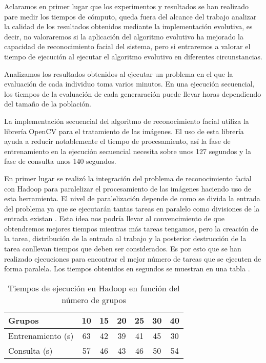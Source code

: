 \label{resultados-facerecognition}

Aclaramos en primer lugar que los experimentos y resultados se han realizado pare medir los tiempos de cómputo, queda fuera del alcance del trabajo analizar la calidad de los resultados obtenidos mediante la implementación evolutiva, es decir, no valoraremos si la aplicaci\'on del algoritmo evolutivo ha mejorado la capacidad de reconocimiento facial del sistema, pero si entraremos a valorar el tiempo de ejecuci\'on al ejecutar el algoritmo evolutivo en diferentes circunstancias.

Analizamos los resultados obtenidos al ejecutar un problema en el que la evaluación de cada individuo toma varios minutos. En una ejecuci\'on secuencial, los tiempos de la evaluación de cada generaraci\'on puede llevar horas dependiendo del tamaño de la población.

La implementaci\'on secuencial del algoritmo de reconocimiento facial utiliza la librer\'ia OpenCV para el tratamiento de las im\'agenes. El uso de esta librer\'ia ayuda a reducir notablemente el tiempo de procesamiento, as\'i la fase de entrenamiento en la ejecuci\'on secuencial necesita sobre unos 127 segundos y la fase de consulta unos 140 segundos. 

En primer lugar se realiz\'o la integraci\'on del problema de reconocimiento facial con Hadoop para paralelizar el procesamiento de las im\'agenes haciendo uso de esta herramienta. El nivel de paralelizaci\'on depende de como se divida la entrada del problema ya que se ejecutar\'an tantas tareas en paralelo como divisiones de la entrada existan . Esta idea nos podr\'ia llevar al convencimiento de que obtendremos mejores tiempos mientras m\'as tareas tengamos, pero la creaci\'on de la tarea, distribuci\'on de la entrada al trabajo y la posterior destrucci\'on de la tarea conllevan tiempos que deben ser considerados. Es por esto que se han realizado ejecuciones para encontrar el mejor n\'umero de tareas que se ejecuten de forma paralela. Los tiempos obtenidos en segundos se muestran en una tabla .

\begin{table}[H]
  \begin{center}
    \begin{center}
    \begin{tabular}{l | c c c c c c}
    Grupos & 10 & 15 & 20 & 25 & 30 & 40 \\ \hline
    Entrenamiento (s) & 63 & 42 & 39 & 41 & 45 & 30\\
    Consulta (s) & 57 & 46 & 43 & 46 & 50 & 54\\
    \end{tabular}
    \end{center}
    \caption{Tiempos de ejecución en Hadoop en funci\'on del n\'umero de grupos}
    \label{tabla-tiempos-num-grupos}
  \end{center}
\end{table}

